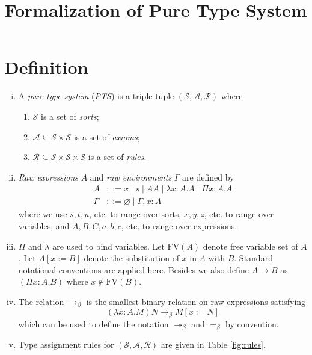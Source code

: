 \documentclass[oneside,a4paper]{article}
\title{\bf Formalization of Pure Type System}
\author{}
\date{}
\numberwithin{equation}{section}
\begin{document}
\maketitle

\section{Definition}
\begin{enumerate}[(i)]
\item A \emph{pure type system} (\emph{PTS}) is a triple tuple $(\mathcal{S},\mathcal{A},\mathcal{R})$ where

\begin{enumerate}
\item $\mathcal{S}$ is a set of \emph{sorts};
\item $\mathcal{A}\subseteq \mathcal{S} \times \mathcal{S}$ is a set of \emph{axioms};
\item $\mathcal{R}\subseteq \mathcal{S} \times \mathcal{S} \times \mathcal{S}$ is a set of \emph{rules}.
\end{enumerate}

\item \emph{Raw expressions} $A$ and \emph{raw environments} $\Gamma$ are defined by
\begin{align*}
A &::= x \mid s \mid AA \mid \lambda x:A.A \mid \Pi x:A.A\\
\Gamma &::= \varnothing \mid \Gamma,x:A
\end{align*}
where we use $s,t,u$, etc. to range over sorts, $x,y,z$, etc. to range over variables, and $A,B,C,a,b,c$, etc. to range over expressions.

\item $\Pi$ and $\lambda$ are used to bind variables. Let $\mathrm{FV}(A)$ denote free variable set of $A$. Let $A[x:=B]$ denote the substitution of $x$ in $A$ with $B$. Standard notational conventions are applied here. Besides we also define $A \to B$ as $(\Pi x:A.B)$ where $x \not \in \mathrm{FV}(B)$.

\item The relation $\to _ \beta$ is the smallest binary relation on raw expressions satisfying \[ (\lambda x:A.M)N \to _ \beta M[x:=N] \]
which can be used to define the notation $\twoheadrightarrow_\beta$ and $=_\beta$ by convention.

\item Type assignment rules for $(\mathcal{S},\mathcal{A},\mathcal{R})$ are given in Table \ref{fig:rules}.


\end{enumerate}
\end{document}
